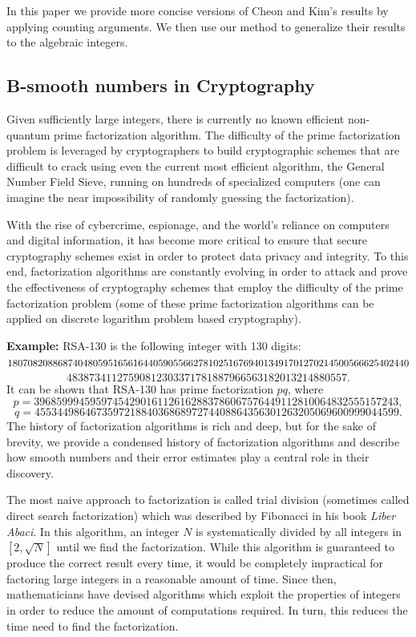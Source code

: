 \documentclass[12pt]{amsart}
\theoremstyle{definition}
\begin{document}
In this paper we provide more concise versions of Cheon and Kim's results by applying counting arguments. We then use our method to generalize their results to the algebraic integers. 

\subsection{B-smooth numbers in Cryptography}
Given sufficiently large integers, there is currently no known efficient non-quantum prime factorization algorithm.
The difficulty of the prime factorization problem is leveraged by cryptographers to build cryptographic schemes that are difficult to crack using even the current most efficient algorithm, the General Number Field Sieve, running on hundreds of specialized computers (one can imagine the near impossibility of randomly guessing the factorization). 

With the rise of cybercrime, espionage, and the world's reliance on computers and digital information, it has become more critical to ensure that secure cryptography schemes exist in order to protect data privacy and integrity. To this end, factorization algorithms are constantly evolving in order to attack and prove the effectiveness of cryptography schemes that employ the difficulty of the prime factorization problem (some of these prime factorization algorithms can be applied on discrete logarithm problem based cryptography).

\noindent\textbf{Example:} RSA-130 is the following integer with 130 digits:
$$18070820886874048059516561644059055662781025167694013491701270214500566625402440\\$$
\vspace{-.7 in}
$$48387341127590812303371781887966563182013214880557.$$
\noindent It can be shown that RSA-130 has prime factorization $pq$, where
$$p = 39685999459597454290161126162883786067576449112810064832555157243,$$
\vspace{-.7 in}
$$q = 45534498646735972188403686897274408864356301263205069600999044599.$$
The history of factorization algorithms is rich and deep, but for the sake of brevity, we provide a condensed history of factorization algorithms and describe how smooth numbers and their error estimates play a central role in their discovery.

The most naive approach to factorization is called trial division (sometimes called direct search factorization) which was described by Fibonacci in his book \textit{Liber Abaci}. In this algorithm, an integer $N$ is systematically divided by all integers in $[2, \sqrt{N}]$ until we find the factorization. While this algorithm is guaranteed to produce the correct result every time, it would be completely impractical for factoring large integers in a reasonable amount of time. Since then, mathematicians have devised algorithms which exploit the properties of integers in order to reduce the amount of computations required. In turn, this reduces the time need to find the factorization.
\end{document}
